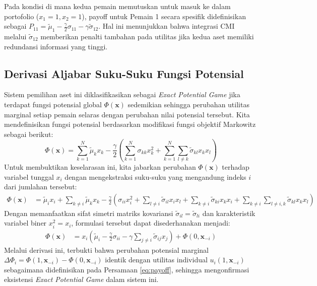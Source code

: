 Pada kondisi di mana kedua pemain memutuskan untuk masuk ke dalam portofolio ($x_1=1, x_2=1$), payoff untuk Pemain 1 secara spesifik didefinisikan sebagai $P_{11} = \tilde{\mu}_1 - \frac{\gamma}{2}\sigma_{11} - \gamma\tilde{\sigma}_{12}$. Hal ini menunjukkan bahwa integrasi CMI melalui $\tilde{\sigma}_{12}$ memberikan penalti tambahan pada utilitas jika kedua aset memiliki redundansi informasi yang tinggi.

\subsection{Derivasi Aljabar Suku-Suku Fungsi Potensial}
Sistem pemilihan aset ini diklasifikasikan sebagai \textit{Exact Potential Game} jika terdapat fungsi potensial global $\Phi(\mathbf{x})$ sedemikian sehingga perubahan utilitas marginal setiap pemain selaras dengan perubahan nilai potensial tersebut. Kita mendefinisikan fungsi potensial berdasarkan modifikasi fungsi objektif Markowitz sebagai berikut:
\begin{equation} \label{eq:potential}
    \Phi(\mathbf{x}) = \sum_{k=1}^N \tilde{\mu}_k x_k - \frac{\gamma}{2} \left( \sum_{k=1}^N \sigma_{kk} x_k^2 + \sum_{k=1}^N \sum_{l \neq k} \tilde{\sigma}_{kl} x_k x_l \right)
\end{equation}
Untuk membuktikan keselarasan ini, kita jabarkan perubahan $\Phi(\mathbf{x})$ terhadap variabel tunggal $x_i$ dengan mengekstraksi suku-suku yang mengandung indeks $i$ dari jumlahan tersebut:
\begin{equation}
\begin{aligned}
    \Phi(\mathbf{x}) &= \tilde{\mu}_i x_i + \sum_{k \neq i} \tilde{\mu}_k x_k - \frac{\gamma}{2} \left( \sigma_{ii} x_i^2 + \sum_{l \neq i} \tilde{\sigma}_{il} x_i x_l + \sum_{k \neq i} \tilde{\sigma}_{ki} x_k x_i + \sum_{k \neq i} \sum_{l \neq i, k} \tilde{\sigma}_{kl} x_k x_l \right)
\end{aligned}
\end{equation}
Dengan memanfaatkan sifat simetri matriks kovariansi $\tilde{\sigma}_{il} = \tilde{\sigma}_{li}$ dan karakteristik variabel biner $x_i^2 = x_i$, formulasi tersebut dapat disederhanakan menjadi:
\begin{equation}
\begin{aligned}
    \Phi(\mathbf{x}) &= x_i \left( \tilde{\mu}_i - \frac{\gamma}{2} \sigma_{ii} - \gamma \sum_{j \neq i} \tilde{\sigma}_{ij} x_j \right) + \Phi(0, \mathbf{x}_{-i})
\end{aligned}
\end{equation}
Melalui derivasi ini, terbukti bahwa perubahan potensial marginal $\Delta \Phi_i = \Phi(1, \mathbf{x}_{-i}) - \Phi(0, \mathbf{x}_{-i})$ identik dengan utilitas individual $u_i(1, \mathbf{x}_{-i})$ sebagaimana didefinisikan pada Persamaan \eqref{eq:payoff}, sehingga mengonfirmasi eksistensi \textit{Exact Potential Game} dalam sistem ini.

